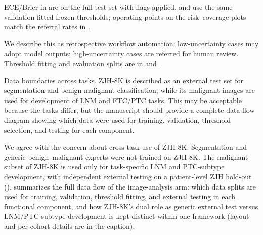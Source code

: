 \begin{authorresponse}
ECE/Brier in  are on the full test set with flags applied.  and  use the same validation-fitted frozen thresholds; operating points on the risk–coverage plots match the referral rates in .\par
We describe this as retrospective workflow automation: low-uncertainty cases may adopt model outputs; high-uncertainty cases are referred for human review. Threshold fitting and evaluation splits are in  and .\par
\par
\end{authorresponse}

\begin{reviewercomment}
Data boundaries across tasks. ZJH-8K is described as an external test set for segmentation and benign-malignant classification, while its malignant images are used for development of LNM and FTC/PTC tasks. This may be acceptable because the tasks differ, but the manuscript should provide a complete data-flow diagram showing which data were used for training, validation, threshold selection, and testing for each component.
\end{reviewercomment}
\begin{authorresponse}
We agree with the concern about cross-task use of ZJH-8K. Segmentation and generic benign–malignant experts were not trained on ZJH-8K. The malignant subset of ZJH-8K is used only for task-specific LNM and PTC-subtype development, with independent external testing on a patient-level ZJH hold-out ().  summarizes the full data flow of the image-analysis arm: which data splits are used for training, validation, threshold fitting, and external testing in each functional component, and how ZJH-8K's dual role as generic external test versus LNM/PTC-subtype development is kept distinct within one framework (layout and per-cohort details are in the caption).\par
\par
\end{authorresponse}

